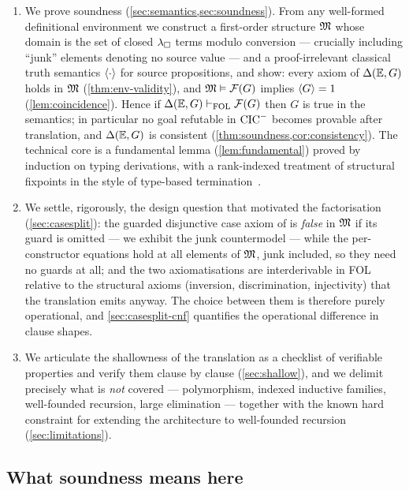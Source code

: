 \begin{enumerate}[leftmargin=2em]
  first-order connectives, per-datatype guard predicates, per-instance
  inductive-predicate atoms, and equality.
\item We prove soundness (\cref{sec:semantics,sec:soundness}).  From any
  well-formed definitional environment we construct a first-order structure
  $\mathfrak{M}$ whose domain is the set of closed $\lambda_{\square}$ terms modulo conversion
  --- crucially including ``junk'' elements denoting no source value ---
  and a proof-irrelevant classical truth semantics $\langle \cdot \rangle$ for source
  propositions, and show: every axiom of $\Delta(\mathbb{E},G)$ holds in $\mathfrak{M}$
  (\cref{thm:env-validity}), and $\mathfrak{M} \vDash \mathcal{F}(G)$ implies $\langle G \rangle = 1$
  (\cref{lem:coincidence}).  Hence if $\Delta(\mathbb{E},G) \vdash_{\mathrm{FOL}} \mathcal{F}(G)$ then $G$ is
  true in the semantics; in particular no goal refutable in $\mathrm{CIC}^{-}$ becomes
  provable after translation, and $\Delta(\mathbb{E},G)$ is consistent
  (\cref{thm:soundness,cor:consistency}).  The technical core is a
  fundamental lemma (\cref{lem:fundamental}) proved by induction on typing
  derivations, with a rank-indexed treatment of structural fixpoints in the
  style of type-based termination~\cite{BartheEtAl2004,Gimenez1995}.
\item We settle, rigorously, the design question that motivated the
  factorisation (\cref{sec:casesplit}): the guarded disjunctive case axiom
  of \cite[\S 5.2]{CzajkaKaliszyk2018} is \emph{false} in $\mathfrak{M}$ if its
  guard is omitted --- we exhibit the junk countermodel --- while the
  per-constructor equations hold at all elements of $\mathfrak{M}$, junk included,
  so they need no guards at all; and the two axiomatisations are
  interderivable in FOL relative to the structural axioms (inversion,
  discrimination, injectivity) that the translation emits anyway.  The
  choice between them is therefore purely operational, and
  \cref{sec:casesplit-cnf} quantifies the operational difference in clause
  shapes.
\item We articulate the shallowness of the translation as a checklist of
  verifiable properties and verify them clause by clause
  (\cref{sec:shallow}), and we delimit precisely what is \emph{not} covered
  --- polymorphism, indexed inductive families, well-founded recursion,
  large elimination --- together with the known hard constraint for
  extending the architecture to well-founded recursion
  (\cref{sec:limitations}).
\end{enumerate}

\subsection{What soundness means here}
\label{sec:intro-soundness}

